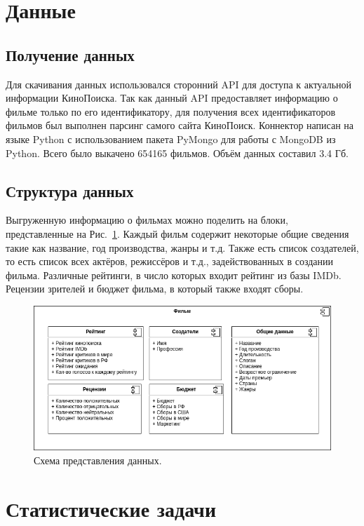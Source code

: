 \documentclass[9pt,conference]{IEEEtran}
\begin{document}
\section{Данные}

\subsection{Получение данных}

Для скачивания данных использовался сторонний API для доступа к актуальной информации КиноПоиска. Так как данный API предоставляет информацию о фильме только по его идентификатору, для получения всех идентификаторов фильмов был выполнен парсинг самого сайта КиноПоиск. Коннектор написан на языке Python с использованием пакета PyMongo для работы с MongoDB из Python. Всего было выкачено 654165 фильмов. Объём данных составил 3.4 Гб.

\subsection{Структура данных}

Выгруженную информацию о фильмах можно поделить на блоки, представленные на Рис.~\ref{fig:1}. Каждый фильм содержит некоторые общие сведения такие как название, год производства, жанры и т.д. Также есть список создателей, то есть список всех актёров, режиссёров и т.д., задействованных в создании фильма. Различные рейтинги, в число которых входит рейтинг из базы IMDb. Рецензии зрителей и бюджет фильма, в который также входят сборы.

\begin{figure}[ht!]
	\includegraphics[width=\linewidth]{../report/images/dataStructure}
	\caption{Схема представления данных.}
	\label{fig:1}
\end{figure}



\section{Статистические задачи}
\end{document}
